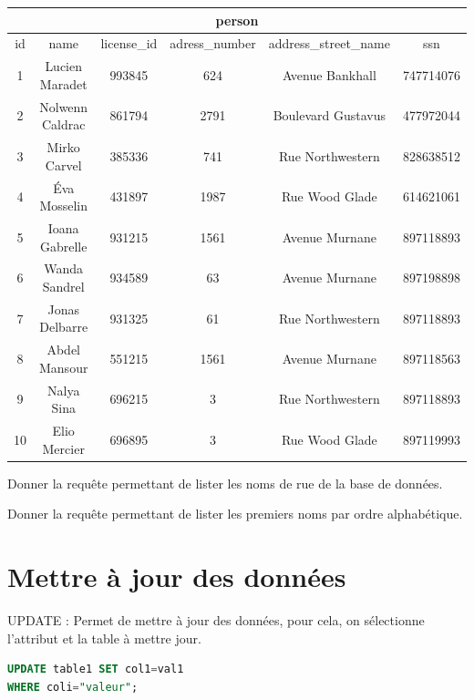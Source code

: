 \begin{Exercise}
    \begin{center}
    \begin{tabular}{|c c c c c c|}
    \hline
    \multicolumn{6}{|c|}{\textbf{person}} \\
    \hline
        id & name & license\_id & adress\_number & address\_street\_name & ssn \\
        \hline
        \hline
        1	& Lucien Maradet	& 993845	& 624	& Avenue Bankhall & 747714076\\
    2	& Nolwenn Caldrac	& 861794	& 2791	& Boulevard Gustavus 	& 477972044\\
    3	& Mirko Carvel	& 385336	& 741	& Rue Northwestern	& 828638512\\
    4	& Éva Mosselin	& 431897	& 1987	& Rue Wood Glade	& 614621061\\
    5	& Ioana Gabrelle & 931215	& 1561	& Avenue Murnane & 897118893\\
    6	& Wanda Sandrel & 934589	& 63	& Avenue Murnane & 897198898\\
    7	& Jonas Delbarre & 931325	& 61	& Rue Northwestern & 897118893\\
    8	& Abdel Mansour & 551215	& 1561	& Avenue Murnane & 897118563\\
    9	& Nalya Sina & 696215	& 3	& Rue Northwestern & 897118893\\
    10	& Elio Mercier & 696895	& 3	& Rue Wood Glade & 897119993\\

    \hline
    \end{tabular}
    \end{center}
    
    \Question Donner la requête permettant de lister les noms de rue de la base de données.\\
    \emptybox{2cm}

    \Question Donner la requête permettant de lister les premiers noms par ordre alphabétique.\\
    \emptybox{2cm}
\end{Exercise} 

\newpage
\section{Mettre à jour des données}
UPDATE : Permet de mettre à jour des données, pour cela, on sélectionne l'attribut et la table à mettre jour.
\begin{lstlisting}[style=SQLstyle, language=SQL]
UPDATE table1 SET col1=val1
WHERE coli="valeur";
\end{lstlisting}

